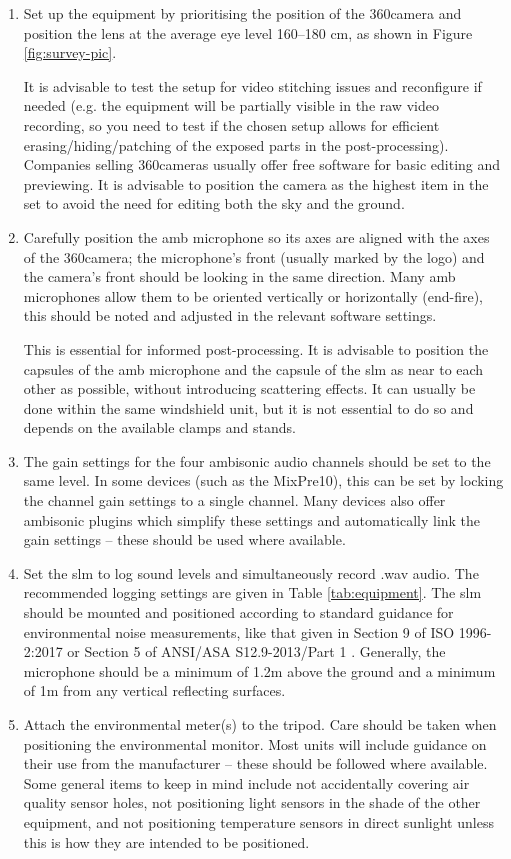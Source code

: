    \begin{enumerate}
     \item Set up the equipment by prioritising the position of the 360\degree camera and position the lens at the average eye level 160--180 cm, as shown in Figure \ref{fig:survey-pic}.

           It is advisable to test the setup for video stitching issues and reconfigure if needed (e.g. the equipment will be partially visible in the raw video recording, so you need to test if the chosen setup allows for efficient erasing/hiding/patching of the exposed parts in the post-processing). Companies selling 360\degree cameras usually offer free software for basic editing and previewing. It is advisable to position the camera as the highest item in the set to avoid the need for editing both the sky and the ground.
     \item Carefully position the \gls{amb} microphone so its axes are aligned with the axes of the 360\degree camera; the microphone's front (usually marked by the logo) and the camera's front should be looking in the same direction. Many \gls{amb} microphones allow them to be oriented vertically or horizontally (end-fire), this should be noted and adjusted in the relevant software settings.

           This is essential for informed post-processing. It is advisable to position the capsules of the \gls{amb} microphone and the capsule of the \gls{slm} as near to each other as possible, without introducing scattering effects. It can usually be done within the same windshield unit, but it is not essential to do so and depends on the available clamps and stands.
     \item The gain settings for the four ambisonic audio channels should be set to the same level. In some devices (such as the MixPre10), this can be set by locking the channel gain settings to a single channel. Many devices also offer ambisonic plugins which simplify these settings and automatically link the gain settings -- these should be used where available.
     \item Set the \gls{slm} to log sound levels and simultaneously record .wav audio. The recommended logging settings are given in Table \ref{tab:equipment}. The \gls{slm} should be mounted and positioned according to standard guidance for environmental noise measurements, like that given in Section 9 of ISO 1996-2:2017  or Section 5 of ANSI/ASA S12.9-2013/Part 1 . Generally, the microphone should be a minimum of 1.2m above the ground and a minimum of 1m from any vertical reflecting surfaces.
     \item Attach the environmental meter(s) to the tripod. Care should be taken when positioning the environmental monitor. Most units will include guidance on their use from the manufacturer -- these should be followed where available. Some general items to keep in mind include not accidentally covering air quality sensor holes, not positioning light sensors in the shade of the other equipment, and not positioning temperature sensors in direct sunlight unless this is how they are intended to be positioned.
   \end{enumerate}

